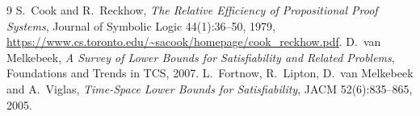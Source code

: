 \documentclass[11pt]{article}
\begin{document}
\begin{thebibliography}{9}
 S.~Cook and R.~Reckhow, \emph{The Relative Efficiency of
Propositional Proof Systems}, Journal of Symbolic Logic 44(1):36--50, 1979,
\url{https://www.cs.toronto.edu/~sacook/homepage/cook_reckhow.pdf}.
 D.~van Melkebeek, \emph{A Survey of Lower Bounds for
Satisfiability and Related Problems}, Foundations and Trends in TCS, 2007.
 L.~Fortnow, R.~Lipton, D.~van Melkebeek and A.~Viglas,
\emph{Time-Space Lower Bounds for Satisfiability}, JACM 52(6):835--865, 2005.
\end{thebibliography}
\end{document}
